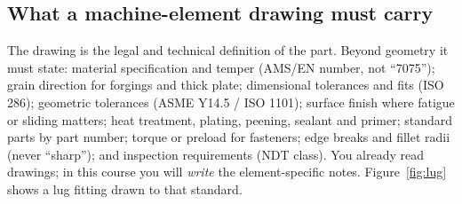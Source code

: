 \documentclass[11pt,a4paper]{article}
\begin{document}
\subsection{What a machine-element drawing must carry}
The drawing is the legal and technical definition of the part. Beyond geometry it must state: material specification and temper (AMS/EN number, not ``7075''); grain direction for forgings and thick plate; dimensional tolerances and fits (ISO 286); geometric tolerances (ASME Y14.5 / ISO 1101); surface finish where fatigue or sliding matters; heat treatment, plating, peening, sealant and primer; standard parts by part number; torque or preload for fasteners; edge breaks and fillet radii (never ``sharp''); and inspection requirements (NDT class). You already read drawings; in this course you will \emph{write} the element-specific notes. Figure~\ref{fig:lug} shows a lug fitting drawn to that standard.
\end{document}
